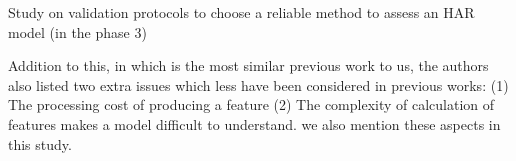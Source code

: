 \documentclass[journal,article,submit,moreauthors,pdftex]{Definitions/mdpi}
\begin{document}
Study on validation protocols to choose a reliable method to assess an HAR model \cite{jordao2018human}(in the phase 3)

%
Addition to this, in \cite{rosati2018comparison} which is the most similar previous work to us, the authors also listed two extra issues which less have been considered in previous works:
(1) The processing cost of producing a feature
(2) The complexity of calculation of features makes a model difficult to understand.
we also mention these aspects in this study.
\end{document}
